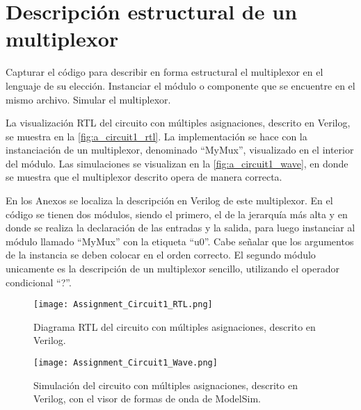 \section{Descripción estructural de un multiplexor \label{sec:s1}}

\begin{center}
	\begin{minipage}{12cm}
		\begin{tcolorbox}[title=Actividad 1]
			Capturar el código para describir en forma estructural el multiplexor en el lenguaje de su elección. Instanciar el módulo o componente que se encuentre en el mismo archivo. Simular el multiplexor.
		\end{tcolorbox}	
	\end{minipage}
\end{center}

La visualización RTL del circuito con múltiples asignaciones, descrito en Verilog, se muestra en la \autoref{fig:a_circuit1_rtl}. La implementación se hace con la instanciación de un multiplexor, denominado ``MyMux'', visualizado en el interior del módulo. Las simulaciones se visualizan en la \autoref{fig:a_circuit1_wave}, en donde se muestra que el multiplexor descrito opera de manera correcta.

En los Anexos se localiza la descripción en Verilog de este multiplexor. En el código se tienen dos módulos, siendo el primero, el de la jerarquía más alta y en donde se realiza la declaración de las entradas y la salida, para luego instanciar al módulo llamado ``MyMux'' con la etiqueta ``u0''. Cabe señalar que los argumentos de la instancia se deben colocar en el orden correcto. El segundo módulo unicamente es la descripción de un multiplexor sencillo, utilizando el operador condicional ``?''.

\begin{figure}[ht]
	\centering
	\texttt{[image: Assignment\_Circuit1\_RTL.png]}
	\caption{Diagrama RTL del circuito con múltiples asignaciones, descrito en Verilog. \label{fig:a_circuit1_rtl}}
\end{figure}

\begin{figure}[ht]
	\centering
	\texttt{[image: Assignment\_Circuit1\_Wave.png]}
	\caption{Simulación del circuito con múltiples asignaciones, descrito en Verilog, con el visor de formas de onda de ModelSim. \label{fig:a_circuit1__wave}}
\end{figure}